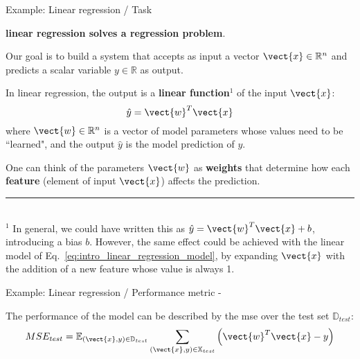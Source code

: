 \begin{frame}[t]{Example: Linear regression / Task}

    {\bf \Gls{linear regression} solves a 
    \gls{regression} problem}.\\
    \vspace{0.2cm}

    Our goal is to build a system that 
    accepts as input a vector $\vect{x} \in \mathbb{R}^n$
    and predicts a scalar variable $y \in \mathbb{R}$ as output.\\
    \vspace{0.2cm}

    In \gls{linear regression}, the output is a 
    {\bf linear function}$^{1}$ of the input $\vect{x}$:
    \begin{equation}
        \hat{y} = \vect{w}^T \vect{x}
        \label{eq:intro_linear_regression_model}
    \end{equation}
    where $\vect{w} \in \mathbb{R}^n$ is a vector of model parameters 
    whose values need to be ``learned", and 
    the output $\hat{y}$ is the model prediction of $y$.\\
    \vspace{0.2cm}

    One can think of the parameters $\vect{w}$ as {\bf weights}
    that determine how each {\bf feature} 
    (element of input $\vect{x}$)
    affects the prediction.\\

    \vspace{0.2cm}
    \noindent\rule{4cm}{0.4pt}\\
    {\scriptsize      
      $^{1}$ In general, we could have written this as
      $\hat{y} = \vect{w}^T \vect{x} + b$, introducing a bias $b$.
      However, the same effect could be achieved with the linear model of 
      Eq.~\ref{eq:intro_linear_regression_model}, by expanding $\vect{x}$
      with the addition of a new feature whose value is always 1.\\
    }

\end{frame}

%
%
%

\begin{frame}[t,allowframebreaks]{
    Example: Linear regression / Performance metric - }

    The performance of the model can be described by the 
    \gls{mse} over the 
    \gls{test set} $\mathbb{D}_{test}$:
    \begin{equation}
        MSE_{test} = 
          \mathbb{E}_{(\vect{x},y) \in \mathbb{D}_{test}}
           \sum_{(\vect{x},y) \in \mathbb{X}_{test}} 
                \Big(\vect{w}^T \vect{x} - y\Big)
        \label{eq:intro_linear_regression_model_mse_test}
    \end{equation}

\end{frame}
